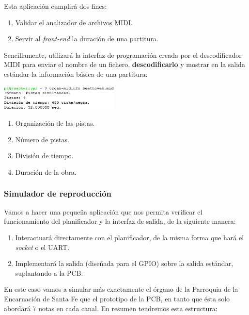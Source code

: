 \documentclass[10pt,a4paper]{article}
\begin{document}
	Esta aplicación cumplirá dos fines:
	
	\begin{enumerate}
		\item Validar el analizador de archivos MIDI.
		\item Servir al \textit{front-end} la duración de una partitura.
	\end{enumerate}
	
	Sencillamente, utilizará la interfaz de programación creada por el descodificador MIDI para enviar el nombre de un fichero, \textbf{descodificarlo} y mostrar en la salida estándar la información básica de una partitura:
	
	\begin{multicols}{2}
		\noindent
		\begin{center}
			\includegraphics[width=0.45\textwidth]{images/cap_midinfo} 
		\end{center}
		\columnbreak
		\begin{enumerate}
			\item Organización de las pistas.
			\item Número de pistas.
			\item División de tiempo.
			\item Duración de la obra.
		\end{enumerate}
	\end{multicols}
		
	\subsubsection*{Simulador de reproducción}
	
	Vamos a hacer una pequeña aplicación que nos permita verificar el funcionamiento del planificador y la interfaz de salida, de la siguiente manera:
	
	\begin{enumerate}
		\item Interactuará directamente con el planificador, de la misma forma que hará el \textit{socket} o el UART.
		\item Implementará la salida (diseñada para el GPIO) sobre la salida estándar, suplantando a la PCB.
	\end{enumerate}
	
	En este caso vamos a simular más exactamente el órgano de la Parroquia de la Encarnación de Santa Fe que el prototipo de la PCB, en tanto que ésta solo abordará 7 notas en cada canal. En resumen tendremos esta estructura:
	
\end{document}
